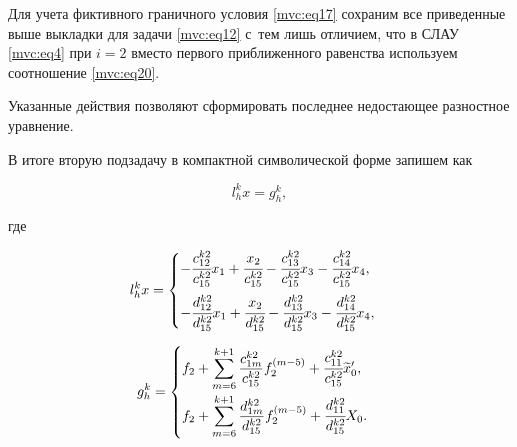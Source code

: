 Для учета фиктивного граничного условия \eqref{mvc:eq17} сохраним все приведенные выше выкладки для задачи \eqref{mvc:eq12} с~тем лишь отличием, что в СЛАУ \eqref{mvc:eq4} при $i=2$ вместо первого приближенного равенства используем соотношение \eqref{mvc:eq20}. 

Указанные действия позволяют сформировать последнее недостающее разностное уравнение.



В итоге вторую подзадачу в компактной символической форме запишем как

\begin{equation}

\label{mvc:eq21}

   l_{h}^kx=g_{h}^k,

\end{equation}

где 

\begin{equation}

\label{mvc:eq22}

   l_{h}^kx

=\begin{cases}  

-\cfrac{c_{12}^{k2}}{c_{15}^{k2}} x_{1}+\cfrac{x_2}{c_{15}^{k2}}-\cfrac{c_{13}^{k2}}{c_{15}^{k2}} x_{3}-\cfrac{c_{14}^{k2}}{c_{15}^{k2}} x_{4},

\\[4mm]

-\cfrac{d_{12}^{k2}}{d_{15}^{k2}} x_{1}+\cfrac{x_2}{d_{15}^{k2}}- \cfrac{d_{13}^{k2}}{d_{15}^{k2}} x_{3}- \cfrac{d_{14}^{k2}}{d_{15}^{k2}} x_{4},

\end{cases}

\end{equation}

\begin{equation}


\label{mvc:eq23}

   g_{h}^k=

\begin{cases}

\displaystyle

f_{2}+\sum_{m=6}^{k+1}\frac{c_{1m}^{k2}}{c_{15}^{k2}} f_2^{(m-5)}+\cfrac{c_{11}^{k2}}{c_{15}^{k2}} \widetilde{x}_0',

\\[4mm]

\displaystyle

f_{2}+\sum_{m=6}^{k+1}\frac{d_{1m}^{k2}}{d_{15}^{k2}} f_2^{(m-5)}+\cfrac{d_{11}^{k2}}{d_{15}^{k2}} X_0.

\end{cases}

\end{equation}

